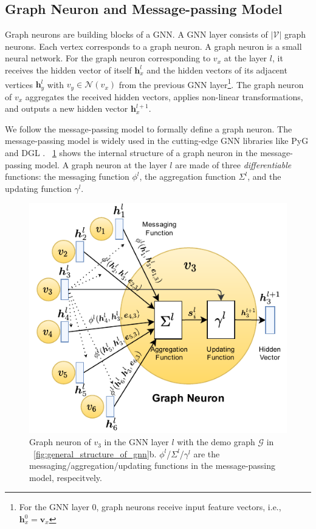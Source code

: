\subsection{Graph Neuron and Message-passing Model}

Graph neurons are building blocks of a GNN.
%
A GNN layer consists of $|\mathcal{V}|$ graph neurons.
%
Each vertex corresponds to a graph neuron.
%
A graph neuron is a small neural network.
%
For the graph neuron corresponding to $v_x$ at the layer $l$, it receives the hidden vector of itself $\boldsymbol{h}^l_x$ and the hidden vectors of its adjacent vertices $\boldsymbol{h}^l_y$ with $v_y \in \mathcal{N}(v_x)$ from the previous GNN layer\footnote{For the GNN layer 0, graph neurons receive input feature vectors, i.e., $\boldsymbol{h}^0_x=\boldsymbol{v}_x$}.
%
The graph neuron of $v_x$ aggregates the received hidden vectors, applies non-linear transformations, and outputs a new hidden vector $\boldsymbol{h}_x^{l+1}$.

We follow the message-passing model \cite{gilmer_messgae_passing} to formally define a graph neuron.
%
The message-passing model is widely used in the cutting-edge GNN libraries like PyG \cite{PyG} and DGL \cite{DGL}.
%
\figurename~\ref{fig:graph_neuron_structure} shows the internal structure of a graph neuron in the message-passing model.
%
A graph neuron at the layer $l$ are made of three \emph{differentiable} functions: the messaging function $\phi^l$, the aggregation function $\Sigma^l$, and the updating function $\gamma^l$.

\begin{figure}[h]
    \centering
    \includegraphics[width=0.5\columnwidth]{figs/illustration/GNN_Unit.pdf}
    \caption{Graph neuron of $v_3$ in the GNN layer $l$ with the demo graph $\mathcal{G}$ in \figurename~\ref{fig:general_structure_of_gnn}b. $\phi^l$/$\Sigma^l$/$\gamma^l$ are the messaging/aggregation/updating functions in the message-passing model, respecitvely.}
    \label{fig:graph_neuron_structure}
\end{figure}

